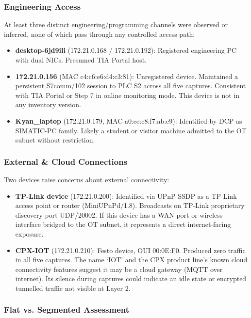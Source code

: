 \subsubsection{Engineering Access}

At least three distinct engineering/programming channels were observed or inferred, none of which pass through any controlled access path:

\begin{itemize}
\item \textbf{desktop-6jd9ili} (172.21.0.168 / 172.21.0.192): Registered engineering PC with dual NICs. Presumed TIA Portal host.
\item \textbf{172.21.0.156} (MAC c4:c6:e6:d4:c3:81): Unregistered device. Maintained a persistent S7comm/102 session to PLC S2 across all five captures. Consistent with TIA Portal or Step 7 in online monitoring mode. This device is not in any inventory version.
\item \textbf{Kyan\_laptop} (172.21.0.179, MAC a0:ce:c8:f7:ab:c9): Identified by DCP as SIMATIC-PC family. Likely a student or visitor machine admitted to the OT subnet without restriction.
\end{itemize}

\subsubsection{External \& Cloud Connections}

Two devices raise concerns about external connectivity:

\begin{itemize}
\item \textbf{TP-Link device} (172.21.0.200): Identified via UPnP SSDP as a TP-Link access point or router (MiniUPnPd/1.8). Broadcasts on TP-Link proprietary discovery port UDP/20002. If this device has a WAN port or wireless interface bridged to the OT subnet, it represents a direct internet-facing exposure.
\item \textbf{CPX-IOT} (172.21.0.210): Festo device, OUI 00:0E:F0. Produced zero traffic in all five captures. The name `IOT' and the CPX product line's known cloud connectivity features suggest it may be a cloud gateway (MQTT over internet). Its silence during captures could indicate an idle state or encrypted tunnelled traffic not visible at Layer 2.
\end{itemize}

\subsubsection{Flat vs. Segmented Assessment}

